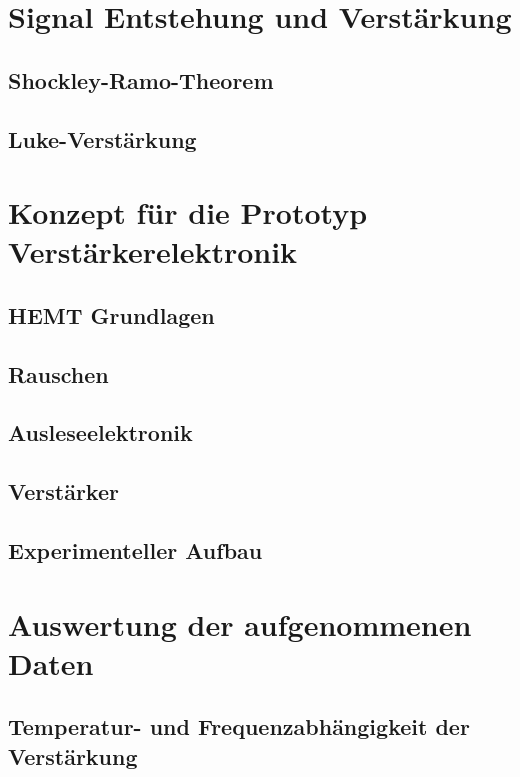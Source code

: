\documentclass{include/thesisclass}
\begin{document}
	\chapter{Signal Entstehung und Verstärkung}\label{sec:Entstehung}
	
	\section{Shockley-Ramo-Theorem}\label{sec:Ramo}
	
	\section{Luke-Verstärkung}\label{sec:LukeAmp}
	
	
	\chapter{Konzept für die Prototyp Verstärkerelektronik}\label{sec:Elektronik}
	\section{HEMT Grundlagen}
	
	\section{Rauschen}\label{sec:Rauschen}
	
	\section{Ausleseelektronik}\label{sec:Ausleseelektronik}
	
	\section{Verstärker}\label{sec:Amp}
	
	\section{Experimenteller Aufbau}
	

    \chapter{Auswertung der aufgenommenen Daten}
    
    \section{Temperatur- und Frequenzabhängigkeit der Verstärkung}\label{sec:AuswertungAmp}
    
\end{document}
